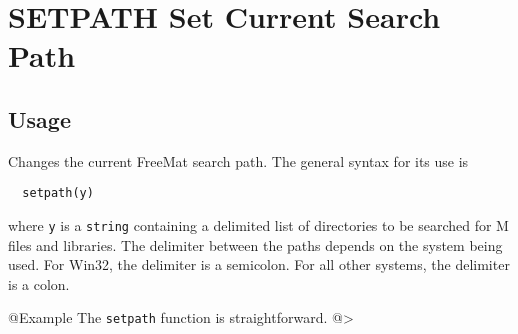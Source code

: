 \section{SETPATH Set Current Search Path}

\subsection{Usage}

Changes the current FreeMat search path.  The general syntax for
its use is
\begin{verbatim}
  setpath(y)
\end{verbatim}
where \verb|y| is a \verb|string| containing a delimited list of directories
to be searched for M files and libraries.  
The delimiter between the paths depends on the system being used.  For Win32, the
delimiter is a semicolon.  For all other systems, the delimiter is a colon.

@Example
The \verb|setpath| function is straightforward.
@>
